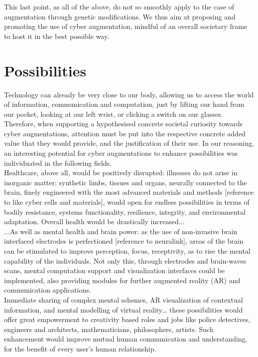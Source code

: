 This last point, as all of the above, do not so smoothly apply to the case of augmentation through genetic modifications. We thus aim at proposing and promoting the use of cyber augmentation, mindful of an overall societary frame to host it in the best possible way.

\section*{Possibilities}
\label{sec:possibilities}
 
Technology can already be very close to our body, allowing us to access the world of information, communication and computation, just by lifting our hand from our pocket, looking at our left wrist, or clicking a switch on our glasses. Therefore, when supporting a hypothesised concrete societal curiosity towards cyber augmentations, attention must be put into the respective concrete added value that they would provide, and the justification of their use. In our reasoning, an interesting potential for cyber augmentations to enhance possibilities was individuated in the following fields.\\

Healthcare, above all, would be positively disrupted: illnesses do not arise in inorganic matter; synthetic limbs, tissues and organs, neurally connected to the brain, finely engineered with the most advanced materials and methods [reference to like cyber cells and materials], would open for endless possibilities in terms of bodily resistance, systems functionality, resilience, integrity, and environmental adaptation. Overall health would be drastically increased...\\

...As well as mental health and brain power: as the use of non-invasive brain interfaced electrodes is perfectioned [reference to neuralink], areas of the brain can be stimulated to improve perception, focus, receptivity, as to rise the mental capability of the individuals. Not only this, through electrodes and brain-waves scans, mental computation support and visualization interfaces could be implemented, also providing modules for further augmented reality (AR) and communication applications.\\

Immediate sharing of complex mental schemes, AR visualization of contextual information, and mental modelling of virtual reality… these possibilities would offer great empowerment to creativity based roles and jobs like police detectives, engineers and architects, mathematicians, philosophers, artists. Such enhancement would improve mutual human communication and understanding, for the benefit of every user’s human relationship.\\

